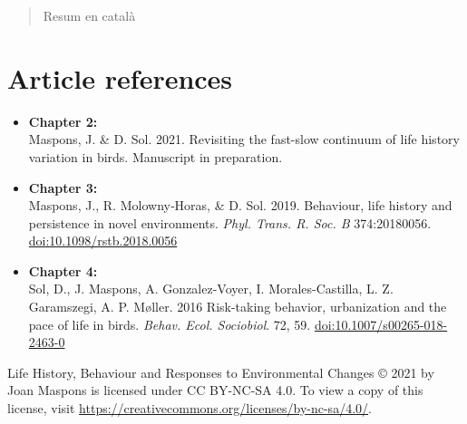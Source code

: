 \documentclass[12pt,a4paper,twoside,fleqn]{memoir}
\begin{document}
\begin{abstract}
\end{abstract}


\renewcommand{\catalanabstractname}{Resum}

\begin{abstract}
Resum en català
\end{abstract}


\clearpage


\section*{Article references}

\begin{itemize}
  \item \textbf{Chapter 2:} \\
  Maspons, J. \& D. Sol. 2021. Revisiting the fast-slow continuum of life history variation in birds. Manuscript in preparation.
  
  \item \textbf{Chapter 3:} \\
  Maspons, J., R. Molowny‐Horas, \& D. Sol. 2019. Behaviour, life history and persistence in novel environments. \textit{Phyl. Trans. R. Soc. B} 374:20180056. \href{http://dx.doi.org/10.1098/rstb.2018.0056}{doi:10.1098/rstb.2018.0056}
  
  \item \textbf{Chapter 4:} \\
  Sol, D., J. Maspons, A. Gonzalez-Voyer, I. Morales-Castilla, L. Z. Garamszegi, A. P. M\o{}ller. 2016 Risk-taking behavior, urbanization and the pace of life in birds. \textit{Behav. Ecol. Sociobiol}. 72, 59. \href{http://dx.doi.org/10.1007/s00265-018-2463-0}{doi:10.1007/s00265-018-2463-0}
\end{itemize}


Life History, Behaviour and Responses to Environmental Changes © 2021 by Joan Maspons is licensed under CC BY-NC-SA 4.0. To view a copy of this license, visit \url{https://creativecommons.org/licenses/by-nc-sa/4.0/}.

\end{document}

